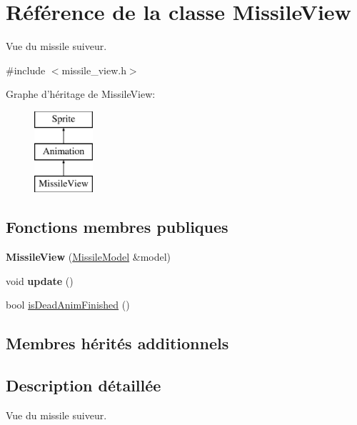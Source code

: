 \hypertarget{class_missile_view}{\section{Référence de la classe Missile\+View}
\label{class_missile_view}
}


Vue du missile suiveur.  




{\ttfamily \#include $<$missile\+\_\+view.\+h$>$}

Graphe d'héritage de Missile\+View\+:\begin{figure}[H]
\begin{center}
\leavevmode
\includegraphics[height=3.000000cm]{class_missile_view}
\end{center}
\end{figure}
\subsection*{Fonctions membres publiques}
\begin{DoxyCompactItemize}
\item 
\hypertarget{class_missile_view_a15ce3555e826e99ae769081b7e80b088}{{\bfseries Missile\+View} (\hyperlink{class_missile_model}{Missile\+Model} \&model)}\label{class_missile_view_a15ce3555e826e99ae769081b7e80b088}

\item 
\hypertarget{class_missile_view_ae6f8c0fd0ae22cb27cb7c984a4457a2f}{void {\bfseries update} ()}\label{class_missile_view_ae6f8c0fd0ae22cb27cb7c984a4457a2f}

\item 
bool \hyperlink{class_missile_view_a1037167e234e571fdc03bbafafb72265}{is\+Dead\+Anim\+Finished} ()
\end{DoxyCompactItemize}
\subsection*{Membres hérités additionnels}


\subsection{Description détaillée}
Vue du missile suiveur. 

